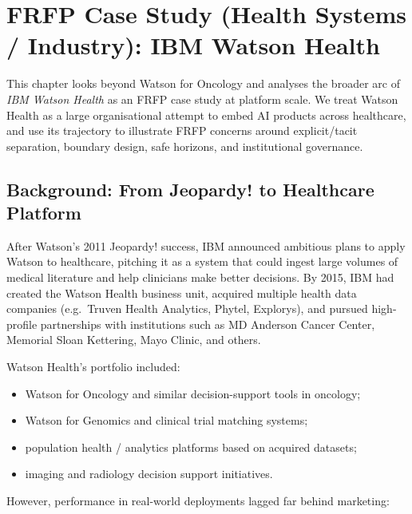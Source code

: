 
\section{FRFP Case Study (Health Systems / Industry): IBM Watson Health}
\label{sec:frfp-watson-health}

This chapter looks beyond Watson for Oncology and analyses the broader arc of
\emph{IBM Watson Health} as an FRFP case study at platform scale. We treat Watson
Health as a large organisational attempt to embed AI products across healthcare,
and use its trajectory to illustrate FRFP concerns around explicit/tacit
separation, boundary design, safe horizons, and institutional governance.

\subsection{Background: From Jeopardy! to Healthcare Platform}

After Watson’s 2011 Jeopardy! success, IBM announced ambitious plans to apply
Watson to healthcare, pitching it as a system that could ingest large volumes of
medical literature and help clinicians make better decisions. By 2015, IBM had
created the Watson Health business unit, acquired multiple health data companies
(e.g.\ Truven Health Analytics, Phytel, Explorys), and pursued high-profile
partnerships with institutions such as MD Anderson Cancer Center, Memorial Sloan
Kettering, Mayo Clinic, and others.

Watson Health’s portfolio included:

\begin{itemize}
  \item Watson for Oncology and similar decision-support tools in oncology;
  \item Watson for Genomics and clinical trial matching systems;
  \item population health / analytics platforms based on acquired datasets;
  \item imaging and radiology decision support initiatives.
\end{itemize}

However, performance in real-world deployments lagged far behind marketing:

